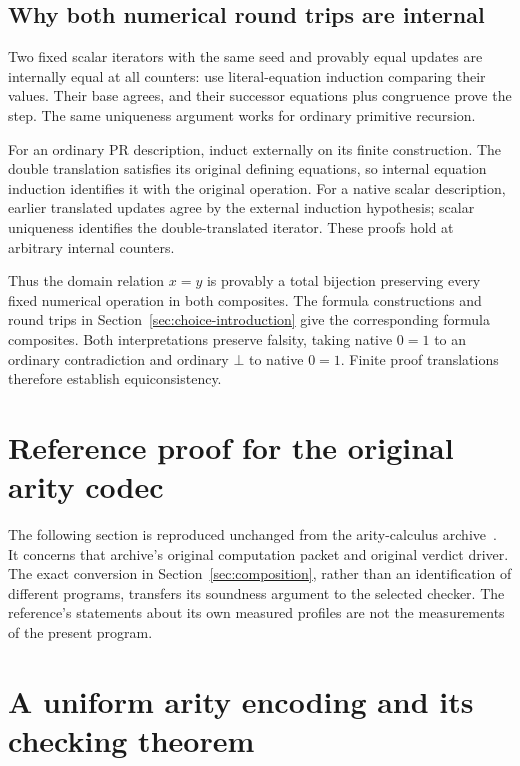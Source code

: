 \documentclass[11pt,letterpaper]{article}
\theoremstyle{definition}\newtheorem{definition}[theorem]{Definition}
\theoremstyle{remark}\newtheorem{remark}[theorem]{Remark}
\begin{document}
\subsection{Why both numerical round trips are internal}

Two fixed scalar iterators with the same seed and provably equal
updates are internally equal at all counters: use literal-equation
induction comparing their values. Their base agrees, and their
successor equations plus congruence prove the step. The same
uniqueness argument works for ordinary primitive recursion.

For an ordinary PR description, induct externally on its finite
construction. The double translation satisfies its original
defining equations, so internal equation induction identifies it
with the original operation. For a native scalar description,
earlier translated updates agree by the external induction
hypothesis; scalar uniqueness identifies the double-translated
iterator. These proofs hold at arbitrary internal counters.

Thus the domain relation $x=y$ is provably a total bijection
preserving every fixed numerical operation in both composites.
The formula constructions and round trips in
Section~\ref{sec:choice-introduction} give the corresponding formula
composites. Both interpretations preserve falsity, taking native
$0=1$ to an ordinary contradiction and ordinary $\bot$ to native
$0=1$. Finite proof translations therefore establish equiconsistency.



\clearpage
\section*{Reference proof for the original arity codec}
The following section is reproduced unchanged from the arity-calculus
archive~\cite{arity}. It concerns that archive's original computation
packet and original verdict driver. The exact conversion in
Section~\ref{sec:composition}, rather than an identification of different
programs, transfers its soundness argument to the selected checker.
The reference's statements about its own measured profiles are not the
measurements of the present program.

\section{A uniform arity encoding and its checking theorem}
\label{sec:arity-checker}
\end{document}
